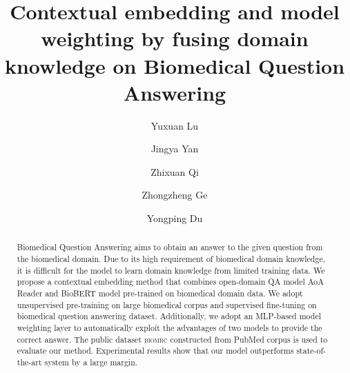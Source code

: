 \documentclass[sigconf, screen]{acmart}
\newcommand{\biomrc}{{\scshape{biomrc}}\xspace}
\newcommand{\biobert}{Bio\-BERT\xspace}
\newcommand{\aoa}{AoA Reader\xspace}
\begin{document}
\title[Contextual embedding and model weighting on Biomedical Question Answering]{Contextual embedding and model weighting by fusing domain knowledge on Biomedical Question Answering}


\author{Yuxuan Lu}


\author{Jingya Yan}


\author{Zhixuan Qi}


\author{Zhongzheng Ge}


\author{Yongping Du}


\renewcommand{\shortauthors}{Yuxuan Lu, et al.}

\begin{abstract}
    Biomedical Question Answering aims to obtain an answer to the given question from the biomedical domain. Due to its high requirement of biomedical domain knowledge, it is difficult for the model to learn domain knowledge from limited training data. We propose a contextual embedding method that combines open-domain QA model \aoa and \biobert model pre-trained on biomedical domain data. We adopt unsupervised pre-training on large biomedical corpus and supervised fine-tuning on biomedical question answering dataset. Additionally, we adopt an MLP-based model weighting layer to automatically exploit the advantages of two models to provide the correct answer. The public dataset \biomrc constructed from PubMed corpus is used to evaluate our method. Experimental results show that our model outperforms state-of-the-art system by a large margin.
\end{abstract}
\end{document}
